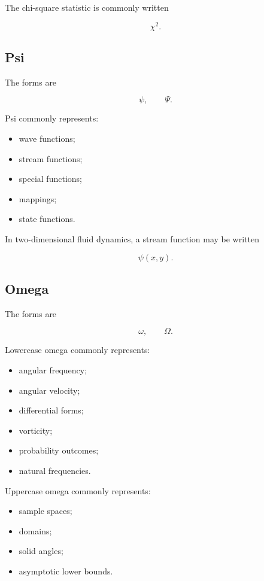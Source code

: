 The chi-square statistic is commonly written

\[
\boxed{
\chi^2.
}
\]

\subsection{Psi}
\label{subsec:greek-psi}

The forms are

\[
\boxed{
\psi,
\qquad
\Psi.
}
\]

Psi commonly represents:

\begin{itemize}
    \item wave functions;
    \item stream functions;
    \item special functions;
    \item mappings;
    \item state functions.
\end{itemize}

In two-dimensional fluid dynamics, a stream function may be written

\[
\boxed{
\psi(x,y).
}
\]

\subsection{Omega}
\label{subsec:greek-omega}

The forms are

\[
\boxed{
\omega,
\qquad
\Omega.
}
\]

Lowercase omega commonly represents:

\begin{itemize}
    \item angular frequency;
    \item angular velocity;
    \item differential forms;
    \item vorticity;
    \item probability outcomes;
    \item natural frequencies.
\end{itemize}

Uppercase omega commonly represents:

\begin{itemize}
    \item sample spaces;
    \item domains;
    \item solid angles;
    \item asymptotic lower bounds.
\end{itemize}

